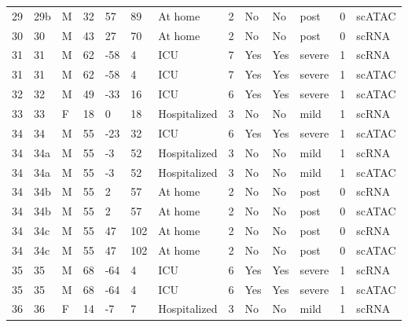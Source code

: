 \documentclass{book}
\begin{document}
\begin{refsection}
\begin{landscape}
\begin{longtable}{p{0.7cm}p{0.7cm}p{0.5cm}p{0.75cm}p{0.75cm}p{0.75cm}p{1.75cm}p{0.8cm}p{0.75cm}p{1cm}p{0.75cm}p{1cm}p{0.75cm}}
    29 & 29b & M & 32 & 57  & 89  & At home                                            & 2 & No  & No  & post   & 0 & scATAC \\
    30 & 30  & M & 43 & 27  & 70  & At home                                            & 2 & No  & No  & post   & 0 & scRNA \\
    31 & 31  & M & 62 & -58 & 4   & ICU                                                & 7 & Yes & Yes & severe & 1 & scRNA \\
    31 & 31  & M & 62 & -58 & 4   & ICU                                                & 7 & Yes & Yes & severe & 1 & scATAC \\
    32 & 32  & M & 49 & -33 & 16  & ICU                                                & 6 & Yes & Yes & severe & 1 & scATAC \\
    33 & 33  & F & 18 & 0   & 18  & Hospitalized                                       & 3 & No  & No  & mild   & 1 & scRNA \\
    34 & 34  & M & 55 & -23 & 32  & ICU                                                & 6 & Yes & Yes & severe & 1 & scATAC \\
    34 & 34a & M & 55 & -3  & 52  & Hospitalized                                       & 3 & No  & No  & mild   & 1 & scRNA \\
    34 & 34a & M & 55 & -3  & 52  & Hospitalized                                       & 3 & No  & No  & mild   & 1 & scATAC \\
    34 & 34b & M & 55 & 2   & 57  & At home                                            & 2 & No  & No  & post   & 0 & scRNA \\
    34 & 34b & M & 55 & 2   & 57  & At home                                            & 2 & No  & No  & post   & 0 & scATAC \\
    34 & 34c & M & 55 & 47  & 102 & At home                                            & 2 & No  & No  & post   & 0 & scRNA \\
    34 & 34c & M & 55 & 47  & 102 & At home                                            & 2 & No  & No  & post   & 0 & scATAC \\
    35 & 35  & M & 68 & -64 & 4   & ICU                                                & 6 & Yes & Yes & severe & 1 & scRNA \\
    35 & 35  & M & 68 & -64 & 4   & ICU                                                & 6 & Yes & Yes & severe & 1 & scATAC \\
    36 & 36  & F & 14 & -7  & 7   & Hospitalized                                       & 3 & No  & No  & mild   & 1 & scRNA \\

\end{longtable}
\end{landscape}
\end{refsection}
\end{document}
